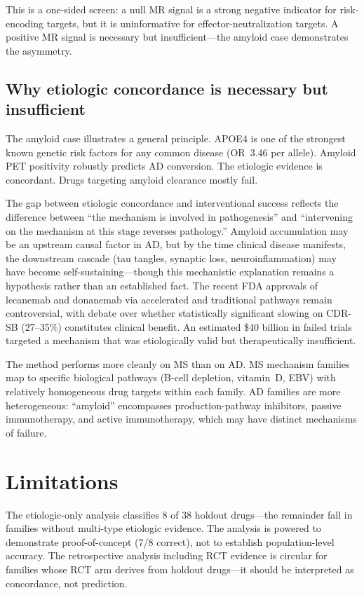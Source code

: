 \documentclass[11pt]{article}
\begin{document}
This is a one-sided screen: a null MR signal is a strong negative indicator for risk-encoding targets, but it is uninformative for effector-neutralization targets. A positive MR signal is necessary but insufficient---the amyloid case demonstrates the asymmetry.

\subsection{Why etiologic concordance is necessary but insufficient}

The amyloid case illustrates a general principle. APOE4 is one of the strongest known genetic risk factors for any common disease (OR~3.46 per allele). Amyloid PET positivity robustly predicts AD conversion. The etiologic evidence is concordant. Drugs targeting amyloid clearance mostly fail.

The gap between etiologic concordance and interventional success reflects the difference between ``the mechanism is involved in pathogenesis'' and ``intervening on the mechanism at this stage reverses pathology.'' Amyloid accumulation may be an upstream causal factor in AD, but by the time clinical disease manifests, the downstream cascade (tau tangles, synaptic loss, neuroinflammation) may have become self-sustaining---though this mechanistic explanation remains a hypothesis rather than an established fact. The recent FDA approvals of lecanemab and donanemab via accelerated and traditional pathways remain controversial, with debate over whether statistically significant slowing on CDR-SB (27--35\%) constitutes clinical benefit. An estimated \$40 billion in failed trials \cite{cummings_zhong2014} targeted a mechanism that was etiologically valid but therapeutically insufficient.

The method performs more cleanly on MS than on AD. MS mechanism families map to specific biological pathways (B-cell depletion, vitamin~D, EBV) with relatively homogeneous drug targets within each family. AD families are more heterogeneous: ``amyloid'' encompasses production-pathway inhibitors, passive immunotherapy, and active immunotherapy, which may have distinct mechanisms of failure.

\section{Limitations}
\label{sec:limitations}

The etiologic-only analysis classifies 8 of 38 holdout drugs---the remainder fall in families without multi-type etiologic evidence. The analysis is powered to demonstrate proof-of-concept (7/8 correct), not to establish population-level accuracy. The retrospective analysis including RCT evidence is circular for families whose RCT arm derives from holdout drugs---it should be interpreted as concordance, not prediction.
\end{document}
